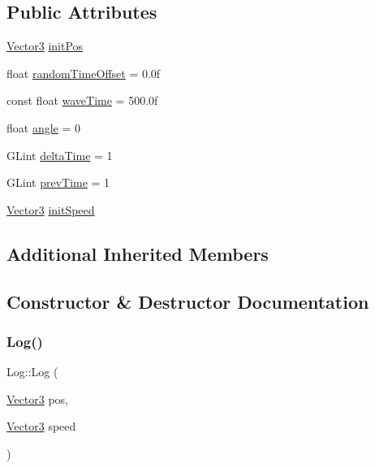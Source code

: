 \subsection*{Public Attributes}
\begin{DoxyCompactItemize}
\item 
\hyperlink{class_vector3}{Vector3} \hyperlink{class_log_a0d213f7219bcc6ea0516da6041cd7911}{init\+Pos}
\item 
float \hyperlink{class_log_a427e736b62232ae99203aa37c20eedc0}{random\+Time\+Offset} = 0.\+0f
\item 
const float \hyperlink{class_log_a95b70921e749674648a01f04834e67df}{wave\+Time} = 500.\+0f
\item 
float \hyperlink{class_log_ab0b1ce09d317ec6ec5f16c9648cc196b}{angle} = 0
\item 
G\+Lint \hyperlink{class_log_a41c7e99b613a8c1d0fb664df5d21e01a}{delta\+Time} = 1
\item 
G\+Lint \hyperlink{class_log_ae1e50d0638372cc9976cc9de946a779b}{prev\+Time} = 1
\item 
\hyperlink{class_vector3}{Vector3} \hyperlink{class_log_a9eac71cb8f2c6006211c30493b235aa4}{init\+Speed}
\end{DoxyCompactItemize}
\subsection*{Additional Inherited Members}


\subsection{Constructor \& Destructor Documentation}
\mbox{\label{class_log_aab0f1ee2fbfa2962846e0c84b032a11f}} 
\subsubsection{\texorpdfstring{Log()}{Log()}}
{\footnotesize\ttfamily Log\+::\+Log (\begin{DoxyParamCaption}\item[{\hyperlink{class_vector3}{Vector3}}]{pos,  }\item[{\hyperlink{class_vector3}{Vector3}}]{speed }\end{DoxyParamCaption})\hspace{0.3cm}{\ttfamily [inline]}}



